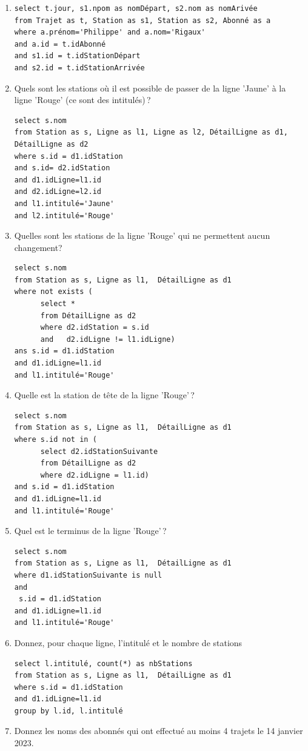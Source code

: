    
\begin{solution}
\begin{enumerate}

 \item 
\begin{verbatim}
select t.jour, s1.npom as nomDépart, s2.nom as nomArivée 
from Trajet as t, Station as s1, Station as s2, Abonné as a
where a.prénom='Philippe' and a.nom='Rigaux'
and a.id = t.idAbonné
and s1.id = t.idStationDépart
and s2.id = t.idStationArrivée
\end{verbatim}     

  \item Quels sont les stations où il est possible de passer de la ligne 'Jaune'  à la ligne 'Rouge'
     (ce sont des intitulés)\,?
\begin{verbatim}
select s.nom
from Station as s, Ligne as l1, Ligne as l2, DétailLigne as d1, DétailLigne as d2
where s.id = d1.idStation
and s.id= d2.idStation
and d1.idLigne=l1.id
and d2.idLigne=l2.id
and l1.intitulé='Jaune'
and l2.intitulé='Rouge'
\end{verbatim}    

  \item Quelles sont les stations de la ligne 'Rouge' qui ne permettent aucun changement?
\begin{verbatim}
select s.nom
from Station as s, Ligne as l1,  DétailLigne as d1
where not exists (
      select * 
      from DétailLigne as d2
      where d2.idStation = s.id
      and   d2.idLigne != l1.idLigne)
ans s.id = d1.idStation
and d1.idLigne=l1.id
and l1.intitulé='Rouge'
\end{verbatim} 
   \item Quelle est la station de tête de la ligne 'Rouge'\,?
\begin{verbatim}
select s.nom
from Station as s, Ligne as l1,  DétailLigne as d1
where s.id not in (
      select d2.idStationSuivante
      from DétailLigne as d2
      where d2.idLigne = l1.id)
and s.id = d1.idStation
and d1.idLigne=l1.id
and l1.intitulé='Rouge'
\end{verbatim} 
   \item Quel est le terminus de la ligne 'Rouge'\,?
\begin{verbatim}
select s.nom
from Station as s, Ligne as l1,  DétailLigne as d1
where d1.idStationSuivante is null
and
 s.id = d1.idStation
and d1.idLigne=l1.id
and l1.intitulé='Rouge'
\end{verbatim} 
   \item Donnez, pour chaque ligne, l'intitulé et le nombre de stations
\begin{verbatim}
select l.intitulé, count(*) as nbStations
from Station as s, Ligne as l1,  DétailLigne as d1
where s.id = d1.idStation
and d1.idLigne=l1.id
group by l.id, l.intitulé
\end{verbatim} 
   \item Donnez les noms des abonnés qui  ont effectué au moins 4 trajets le 14 janvier 2023.


\end{enumerate}
\end{solution}
